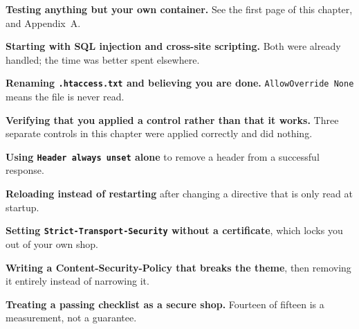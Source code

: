 \begin{pitfall}
\begin{tight}
  \item \textbf{Testing anything but your own container.} See the first page of
        this chapter, and Appendix~A.
  \item \textbf{Starting with SQL injection and cross-site scripting.} Both
        were already handled; the time was better spent elsewhere.
  \item \textbf{Renaming \texttt{.htaccess.txt} and believing you are done.}
        \texttt{AllowOverride None} means the file is never read.
  \item \textbf{Verifying that you applied a control rather than that it
        works.} Three separate controls in this chapter were applied correctly
        and did nothing.
  \item \textbf{Using \texttt{Header always unset} alone} to remove a header
        from a successful response.
  \item \textbf{Reloading instead of restarting} after changing a directive
        that is only read at startup.
  \item \textbf{Setting \texttt{Strict-Transport-Security} without a
        certificate}, which locks you out of your own shop.
  \item \textbf{Writing a Content-Security-Policy that breaks the theme}, then
        removing it entirely instead of narrowing it.
  \item \textbf{Treating a passing checklist as a secure shop.} Fourteen of
        fifteen is a measurement, not a guarantee.
\end{tight}
\end{pitfall}

